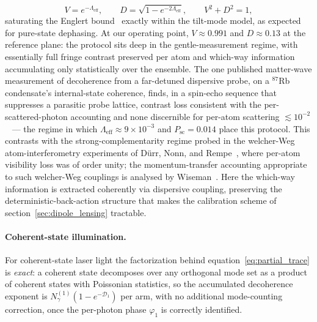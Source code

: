 \documentclass[11pt,a4paper]{article}
\begin{document}
\begin{equation}
V = e^{-\Lambda_\text{eff}}, \qquad D = \sqrt{1 - e^{-2\Lambda_\text{eff}}}, \qquad V^2 + D^2 = 1,
\label{eq:englert}
\end{equation}
saturating the Englert bound~\cite{Englert1996} exactly within the tilt-mode model, as expected for pure-state dephasing. At our operating point, $V \approx 0.991$ and $D \approx 0.13$ at the reference plane: the protocol sits deep in the gentle-measurement regime, with essentially full fringe contrast preserved per atom and which-way information accumulating only statistically over the ensemble. The one published matter-wave measurement of decoherence from a far-detuned dispersive probe, on a $^{87}$Rb condensate's internal-state coherence, finds, in a spin-echo sequence that suppresses a parasitic probe lattice, contrast loss consistent with the per-scattered-photon accounting and none discernible for per-atom scattering $\lesssim 10^{-2}$~\cite{Altuntas2023} --- the regime in which $\Lambda_\text{eff} \approx 9\times 10^{-3}$ and $P_\text{sc} = 0.014$ place this protocol. This contrasts with the strong-complementarity regime probed in the welcher-Weg atom-interferometry experiments of D\"urr, Nonn, and Rempe~\cite{Durr1998}, where per-atom visibility loss was of order unity; the momentum-transfer accounting appropriate to such welcher-Weg couplings is analysed by Wiseman~\cite{Wiseman1998}. Here the which-way information is extracted coherently via dispersive coupling, preserving the deterministic-back-action structure that makes the calibration scheme of section~\ref{sec:dipole_lensing} tractable.

\paragraph{Coherent-state illumination.} For coherent-state laser light the factorization behind equation~\eqref{eq:partial_trace} is \emph{exact}: a coherent state decomposes over any orthogonal mode set as a product of coherent states with Poissonian statistics, so the accumulated decoherence exponent is $N_\gamma^{(1)}(1 - e^{-\mathcal{D}_1})$ per arm, with no additional mode-counting correction, once the per-photon phase $\varphi_1$ is correctly identified.
\end{document}
